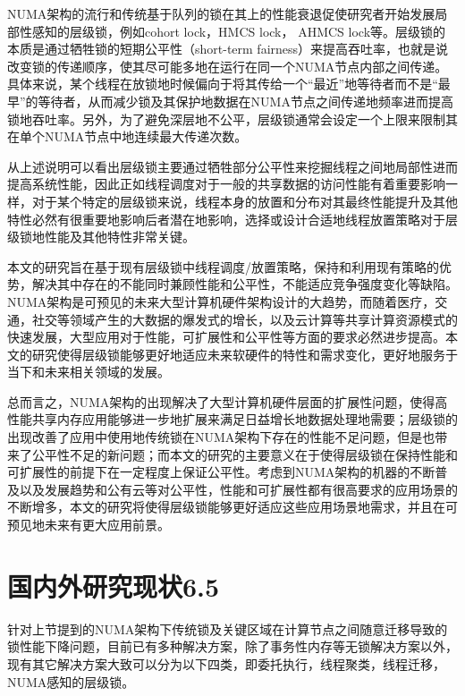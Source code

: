 NUMA架构的流行和传统基于队列的锁在其上的性能衰退促使研究者开始发展局部性感知的层级锁，例如cohort lock，HMCS lock， AHMCS lock等。层级锁的本质是通过牺牲锁的短期公平性（short-term fairness）来提高吞吐率，也就是说改变锁的传递顺序，使其尽可能多地在运行在同一个NUMA节点内部之间传递。具体来说，某个线程在放锁地时候偏向于将其传给一个“最近”地等待者而不是“最早”的等待者，从而减少锁及其保护地数据在NUMA节点之间传递地频率进而提高锁地吞吐率。另外，为了避免深层地不公平，层级锁通常会设定一个上限来限制其在单个NUMA节点中地连续最大传递次数。

从上述说明可以看出层级锁主要通过牺牲部分公平性来挖掘线程之间地局部性进而提高系统性能，因此正如线程调度对于一般的共享数据的访问性能有着重要影响一样，对于某个特定的层级锁来说，线程本身的放置和分布对其最终性能提升及其他特性必然有很重要地影响后者潜在地影响，选择或设计合适地线程放置策略对于层级锁地性能及其他特性非常关键。

本文的研究旨在基于现有层级锁中线程调度/放置策略，保持和利用现有策略的优势，解决其中存在的不能同时兼顾性能和公平性，不能适应竞争强度变化等缺陷。NUMA架构是可预见的未来大型计算机硬件架构设计的大趋势，而随着医疗，交通，社交等领域产生的大数据的爆发式的增长，以及云计算等共享计算资源模式的快速发展，大型应用对于性能，可扩展性和公平性等方面的要求必然进步提高。本文的研究使得层级锁能够更好地适应未来软硬件的特性和需求变化，更好地服务于当下和未来相关领域的发展。

总而言之，NUMA架构的出现解决了大型计算机硬件层面的扩展性问题，使得高性能共享内存应用能够进一步地扩展来满足日益增长地数据处理地需要；层级锁的出现改善了应用中使用地传统锁在NUMA架构下存在的性能不足问题，但是也带来了公平性不足的新问题；而本文的研究的主要意义在于使得层级锁在保持性能和可扩展性的前提下在一定程度上保证公平性。考虑到NUMA架构的机器的不断普及以及发展趋势和公有云等对公平性，性能和可扩展性都有很高要求的应用场景的不断增多，本文的研究将使得层级锁能够更好适应这些应用场景地需求，并且在可预见地未来有更大应用前景。
\section{国内外研究现状6.5}
针对上节提到的NUMA架构下传统锁及关键区域在计算节点之间随意迁移导致的锁性能下降问题，目前已有多种解决方案，除了事务性内存等无锁解决方案以外，现有其它解决方案大致可以分为以下四类，即委托执行，线程聚类，线程迁移，NUMA感知的层级锁。

